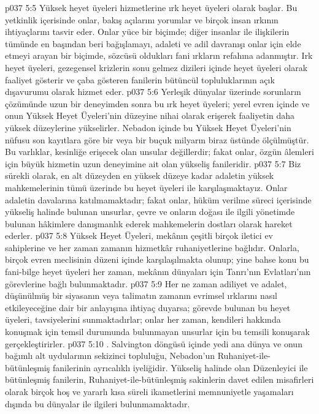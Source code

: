\vs p037 5:5 Yüksek heyet üyeleri hizmetlerine ırk heyet üyeleri olarak başlar. Bu yetkinlik içerisinde onlar, bakış açılarını yorumlar ve birçok insan ırkının ihtiyaçlarını tasvir eder. Onlar yüce bir biçimde; diğer insanlar ile ilişkilerin tümünde en başından beri bağışlamayı, adaleti ve adil davranışı onlar için elde etmeyi arayan bir biçimde, sözcüsü oldukları fani ırkların refahına adanmıştır. Irk heyet üyeleri, gezegensel krizlerin sonu gelmez dizileri içinde heyet üyeleri olarak faaliyet gösterir ve çaba gösteren fanilerin bütüncül topluluklarının açık dışavurumu olarak hizmet eder.
\vs p037 5:6 Yerleşik dünyalar üzerinde sorunların çözümünde uzun bir deneyimden sonra bu ırk heyet üyeleri; yerel evren içinde ve onun Yüksek Heyet Üyeleri’nin düzeyine nihai olarak erişerek faaliyetin daha yüksek düzeylerine yükselirler. Nebadon içinde bu Yüksek Heyet Üyeleri’nin nüfusu son kayıtlara göre bir veya bir buçuk milyarın biraz üstünde ölçülmüştür. Bu varlıklar, kesinliğe erişecek olan unsular değillerdir; fakat onlar, özgün âlemleri için büyük hizmetin uzun deneyimine ait olan yükseliş fanileridir.
\vs p037 5:7 Biz sürekli olarak, en alt düzeyden en yüksek düzeye kadar adaletin yüksek mahkemelerinin tümü üzerinde bu heyet üyeleri ile karşılaşmaktayız. Onlar adaletin davalarına katılmamaktadır; fakat onlar, hüküm verilme süreci içerisinde yükseliş halinde bulunan unsurlar, çevre ve onların doğası ile ilgili yönetimde bulunan hâkimlere danışmanlık ederek mahkemelerin dostları olarak hareket ederler.
\vs p037 5:8 Yüksek Heyet Üyeleri, mekânın çeşitli birçok iletici ev sahiplerine ve her zaman zamanın hizmetkâr ruhaniyetlerine bağlıdır. Onlarla, birçok evren meclisinin düzeni içinde karşılaşılmakta olunup; yine bahse konu bu fani\hyp{}bilge heyet üyeleri her zaman, mekânın dünyaları için Tanrı’nın Evlatları’nın görevlerine bağlı bulunmaktadır.
\vs p037 5:9 Her ne zaman adiliyet ve adalet, düşünülmüş bir siyasanın veya talimatın zamanın evrimsel ırklarını nasıl etkileyeceğine dair bir anlayışına ihtiyaç duyarsa; görevde bulunan bu heyet üyeleri, tavsiyelerini sunmaktadırlar; onlar her zaman, kendileri hakkında konuşmak için temsil durumunda bulunmayan unsurlar için bu temsili konuşarak gerçekleştirirler.
\vs p037 5:10 . Salvington döngüsü içinde yedi ana dünya ve onun bağımlı alt uydularının sekizinci topluluğu, Nebadon’un Ruhaniyet\hyp{}ile\hyp{}bütünleşmiş fanilerinin ayrıcalıklı iyeliğidir. Yükseliş halinde olan Düzenleyici ile bütünleşmiş fanilerin, Ruhaniyet\hyp{}ile\hyp{}bütünleşmiş sakinlerin davet edilen misafirleri olarak birçok hoş ve yararlı kısa süreli ikametlerini memnuniyetle yaşamaları dışında bu dünyalar ile ilgileri bulunmamaktadır.

